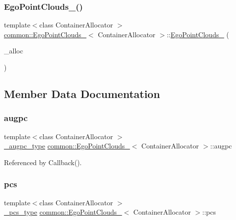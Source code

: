 \subsubsection{\texorpdfstring{Ego\+Point\+Clouds\+\_\+()}{EgoPointClouds\_()}\hspace{0.1cm}{\footnotesize\ttfamily [2/2]}}
{\footnotesize\ttfamily template$<$class Container\+Allocator $>$ \\
\hyperlink{structcommon_1_1EgoPointClouds__}{common\+::\+Ego\+Point\+Clouds\+\_\+}$<$ Container\+Allocator $>$\+::\hyperlink{structcommon_1_1EgoPointClouds__}{Ego\+Point\+Clouds\+\_\+} (\begin{DoxyParamCaption}\item[{const Container\+Allocator \&}]{\+\_\+alloc }\end{DoxyParamCaption})\hspace{0.3cm}{\ttfamily [inline]}}



\subsection{Member Data Documentation}
\mbox{\label{structcommon_1_1EgoPointClouds___a6ef7f04027158021ac93209e1a9b696a}} 
\subsubsection{\texorpdfstring{augpc}{augpc}}
{\footnotesize\ttfamily template$<$class Container\+Allocator $>$ \\
\hyperlink{structcommon_1_1EgoPointClouds___ab7459c5c41c654d199a21f760dd00379}{\+\_\+augpc\+\_\+type} \hyperlink{structcommon_1_1EgoPointClouds__}{common\+::\+Ego\+Point\+Clouds\+\_\+}$<$ Container\+Allocator $>$\+::augpc}



Referenced by Callback().

\mbox{\label{structcommon_1_1EgoPointClouds___aefd8e4c72a8c165032a5a0d85e6f95b1}} 
\subsubsection{\texorpdfstring{pcs}{pcs}}
{\footnotesize\ttfamily template$<$class Container\+Allocator $>$ \\
\hyperlink{structcommon_1_1EgoPointClouds___ae9a969cfa2bb2b88e7c3dad0cfe9373d}{\+\_\+pcs\+\_\+type} \hyperlink{structcommon_1_1EgoPointClouds__}{common\+::\+Ego\+Point\+Clouds\+\_\+}$<$ Container\+Allocator $>$\+::pcs}



